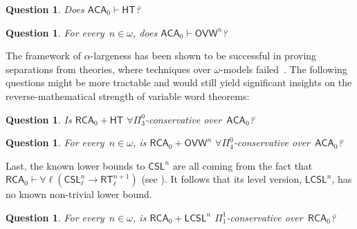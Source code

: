 \documentclass{article}
\numberwithin{theorem}{section}
\newtheorem{question}[theorem]{Question}
\newcommand{\RCA}{\mathsf{RCA}}
\newcommand{\ACA}{\mathsf{ACA}}
\newcommand{\OVW}{\mathsf{OVW}}
\newcommand{\CSL}{\mathsf{CSL}}
\newcommand{\RFCSL}{\mathsf{LCSL}}
\newcommand{\HT}{\mathsf{HT}} %
\newcommand{\RT}{\mathsf{RT}}
\begin{document}
\begin{question}
Does $\ACA_0 \vdash \HT$?
\end{question}

\begin{question}
For every~$n \in \omega$, does $\ACA_0 \vdash \OVW^n$?
\end{question}


The framework of $\alpha$-largeness has been shown to be successful in proving separations from theories, where techniques over $\omega$-models failed~\cite{houerou2024pi}. The following questions might be more tractable and would still yield significant insights on the reverse-mathematical strength of variable word theorems:

\begin{question}
Is $\RCA_0 + \HT$ $\forall \Pi^0_3$-conservative over~$\ACA_0$?
\end{question}

\begin{question}
For every~$n \in \omega$, is $\RCA_0 + \OVW^n$ $\forall \Pi^0_4$-conservative over~$\ACA_0$?
\end{question}

Last, the known lower bounds to $\CSL^n$ are all coming from the fact that $\RCA_0 \vdash \forall \ell(\CSL^n_\ell \to \RT^{n+1}_\ell)$ (see ). It follows that its level version, $\RFCSL^n$, has no known non-trivial lower bound.

\begin{question}
For every~$n \in \omega$, is $\RCA_0 + \RFCSL^n$ $\Pi^1_1$-conservative over~$\RCA_0$?
\end{question}



\end{document}
